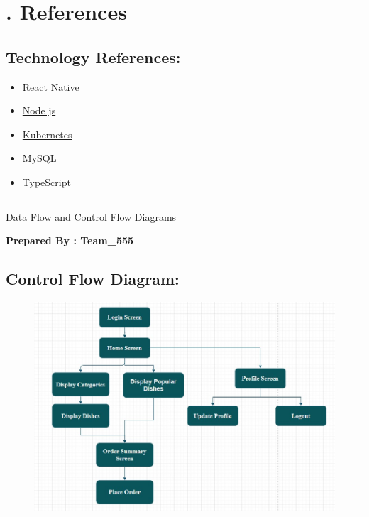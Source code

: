 \documentclass{scrreprt}
\begin{document}
\chapter{. References}
\section*{Technology References:}
\begin{itemize}
    \item  \href{https://reactnative.dev/}{React Native} \\
 \item \href{https://nodejs.org/en/}{Node js} \\
\item \href{https://kubernetes.io/}{Kubernetes} \\
\item \href{https://www.mysql.com/}{MySQL} \\
\item \href{https://www.typescriptlang.org/}{TypeScript} 
\end{itemize}
\newpage
\begin{flushright}
    \rule{16cm}{5pt}\vskip1cm
    \begin{bfseries}
        \Huge{Data Flow and Control Flow Diagrams}\\
        \vspace{1.5cm}
        \vspace{1.5cm}
        
        \vspace{1.5cm}
     \textbf{Prepared By : Team_555}
        \vspace{1.5cm}
        \vspace{1.5cm}
        
    \end{bfseries}
\end{flushright}

\newpage
\section*{Control Flow Diagram:}
\vspace{20pt}
\begin{figure}[h!]
    \includegraphics[scale=0.55]{Control_flow.jpeg}
   
    
\end{figure}
\newpage
\end{document}
